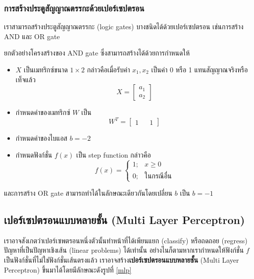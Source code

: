 \documentclass{cpereport}
\begin{document}
\subsubsection{การสร้างประตูสัญญาณตรรกะด้วยเปอร์เซปตรอน}
เราสามารถสร้างประตูสัญญาณตรรกะ (logic gates) บางชนิดได้ด้วยเปอร์เซปตรอน เช่นการสร้าง AND และ OR gate

ยกตัวอย่างโครงสร้างของ AND gate ซึ่งสามารถสร้างได้ด้วยการกำหนดให้
\begin{itemize}
    \item $X$ เป็นเมทริกซ์ขนาด $1 \times 2$ กล่าวคือเมื่อรับค่า $x_1, x_2$ เป็นค่า 0 หรือ 1 แทนสัญญาณจริงหรือเท็จแล้ว
        $$X = \begin{bmatrix}
            a_1 \\
            a_2
        \end{bmatrix}$$
    \item กำหนดค่าของเมทริกซ์ $W$ เป็น
        $$W^T = \begin{bmatrix}
            1 && 1
        \end{bmatrix}$$
    \item กำหนดค่าของไบแอส $b = -2$
    \item กำหนดฟังก์ชั่น $f(x)$ เป็น step function กล่าวคือ
    $$
        f(x) = \begin{cases}
            1; & x \geq 0\\
            0; & \textrm{ในกรณีอื่น}
        \end{cases}
    $$
\end{itemize}
และการสร้าง OR gate สามารถทำได้ในลักษณะเดียวกันโดยเปลี่ยน $b$ เป็น $b = -1$

\subsection{เปอร์เซปตรอนแบบหลายชั้น (Multi Layer Perceptron)}

เราอาจสังเกตว่าเปอร์เซพตรอนหนึ่งตัวนั้นทำหน้าที่ได้เพียนแยก (classify) หรือถดถอย (regress) ปัญหาที่เป็นปัญหาเชิงเส้น (linear problems) ได้เท่านั้น อย่างไนก็ตามหากเรากำหนดให้ฟังก์ชั่น $f$ เป็นฟังก์ชั่นที่ไม่ใช่ฟังก์ชั่นเส้นตรงแล้ว เราอาจสร้าง\textbf{เปอร์เซปตรอนแบบหลายชั้น} (Multi Layer Perceptron) ขึ้นมาได้โดยมีลักษณะดังรูปที่ \ref{mlp}
\end{document}
